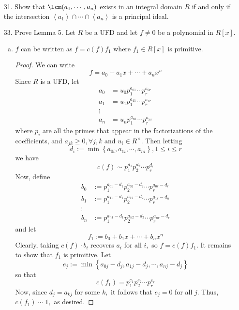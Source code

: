 \documentclass{article}
\begin{document}
\begin{itemize}
\begin{proof}
			If $R$ is not a field, then there exists a nonunit $r\in R\setminus R^\times.$ Then consider the descending chain
			\[\left< r\right>\supset \left< r^2\right> \supset \left< r^3\right> \supset \cdots\]
			This is a strictly descending chain of principal ideals, since $r^{k+1}\neq ur^k$ for any $u\in R^\times.$ Thus, $R$ does not satisfy DCCP.
		\end{proof}

	\item[31.] Show that $\lcm(a_1, \cdots, a_n)$ exists in an integral domain $R$ if and only if the intersection $\left< a_1\right>\cap\cdots\cap \left< a_n\right>$ is a principal ideal.
		
	\item[33.] Prove Lemma 5. Let $R$ be a UFD and let $f\neq 0$ be a polynomial in $R[x].$ 

		\begin{enumerate}[(a)]
			\item $f$ can be written as $f=c(f)f_1$ where $f_1\in R[x]$ is primitive.
				\begin{proof}
					We can write
					\[f=a_0+a_1x+\cdots+a_nx^n\]
					Since $R$ is a UFD, let
					\begin{align*}
						a_0&=u_0p_1^{a_{01}}\cdots p_r^{a_{0r}} \\
						a_1&=u_1p_1^{a_{11}}\cdots p_r^{a_{1r}} \\
						\vdots& \\
						a_n&=u_np_1^{a_{n1}}\cdots p_r^{a_{nr}}
					\end{align*}
					where $p_i$ are all the primes that appear in the factorizations of the coefficients, and $a_{jk}\ge 0, \forall j, k$ and $u_i\in R^\times.$ Then letting 
					\[d_i:=\min\left\{ a_{0i}, a_{1i}, \cdots, a_{ni} \right\}, 1\le i\le r\]
					we have
					\[c(f) \sim p_1^{d_1}p_2^{d_2}\cdots p_r^{d_r}\]
					Now, define
					\begin{align*}
						b_0 &:= p_1^{a_{01}-d_1} p_2^{a_{02}-d_2}\cdots p_r^{a_{0r}-d_r} \\
						b_1 &:= p_1^{a_{11}-d_1}p_2^{a_{12}-d_2}\cdots p_r^{a_{1r}-d_n} \\
						\vdots & \\
						b_n &:= p_1^{a_{n1}-d_1} p_2^{a_{n2}-d_2}\cdots p_r^{a_{nr}-d_r}
					\end{align*}
					and let
					\[f_1:=b_0+b_1x+\cdots +b_n x^n\]
					Clearly, taking $c(f)\cdot b_i$ recovers $a_i$ for all $i,$ so $f = c(f)f_1.$ It remains to show that $f_1$ is primitive. Let
					\[e_j := \min\left\{ a_{0j}-d_j, a_{1j}-d_j, \cdots, a_{nj}-d_j \right\}\]
					so that
					\[c(f_1) = p_1^{e_1}p_2^{e_2}\cdots p_r^{e_r}\]
					Now, since $d_j=a_{kj}$ for some $k,$ it follows that $e_j=0$ for all $j.$ Thus, $c(f_1)\sim 1,$ as desired.
				\end{proof}


\end{enumerate}
\end{itemize}
\end{document}
